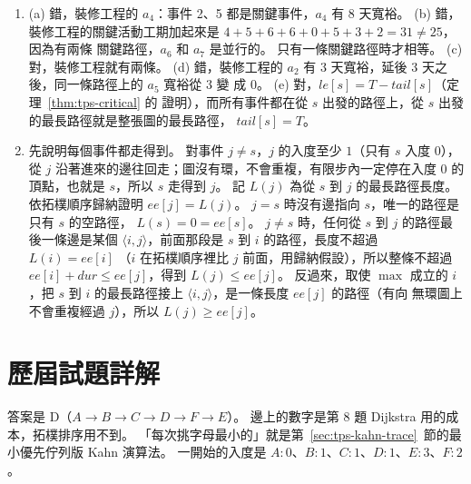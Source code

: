 \begin{enumerate}
\item (a) 錯，裝修工程的 $a_4$：事件 2、5 都是關鍵事件，$a_4$ 有 $8$ 天寬裕。 (b) 錯，
裝修工程的關鍵活動工期加起來是 $4 + 5 + 6 + 6 + 0 + 5 + 3 + 2 = 31 \ne 25$，因為有兩條
關鍵路徑，$a_6$ 和 $a_7$ 是並行的。 只有一條關鍵路徑時才相等。 (c) 對，裝修工程就有兩條。
(d) 錯，裝修工程的 $a_2$ 有 $3$ 天寬裕，延後 $3$ 天之後，同一條路徑上的 $a_5$ 寬裕從 $3$ 變
成 $0$。 (e) 對，$\mathit{le}[s] = T - \mathit{tail}[s]$（定理~\ref{thm:tps-critical} 的
證明），而所有事件都在從 $s$ 出發的路徑上，從 $s$ 出發的最長路徑就是整張圖的最長路徑，
$\mathit{tail}[s] = T$。

\item 先說明每個事件都走得到。 對事件 $j \ne s$，$j$ 的入度至少 $1$（只有 $s$ 入度 $0$），
從 $j$ 沿著進來的邊往回走；圖沒有環，不會重複，有限步內一定停在入度 $0$ 的頂點，也就是
$s$，所以 $s$ 走得到 $j$。 記 $L(j)$ 為從 $s$ 到 $j$ 的最長路徑長度。 依拓樸順序歸納證明
$\mathit{ee}[j] = L(j)$。 $j = s$ 時沒有邊指向 $s$，唯一的路徑是只有 $s$ 的空路徑，
$L(s) = 0 = \mathit{ee}[s]$。 $j \ne s$ 時，任何從 $s$ 到 $j$ 的路徑最後一條邊是某個
$\langle i, j \rangle$，前面那段是 $s$ 到 $i$ 的路徑，長度不超過 $L(i) = \mathit{ee}[i]$
（$i$ 在拓樸順序裡比 $j$ 前面，用歸納假設），所以整條不超過 $\mathit{ee}[i] + \mathit{dur}
\le \mathit{ee}[j]$，得到 $L(j) \le \mathit{ee}[j]$。 反過來，取使 $\max$ 成立的 $i$，把
$s$ 到 $i$ 的最長路徑接上 $\langle i, j \rangle$，是一條長度 $\mathit{ee}[j]$ 的路徑（有向
無環圖上不會重複經過 $j$），所以 $L(j) \ge \mathit{ee}[j]$。
\end{enumerate}

\section*{歷屆試題詳解}

答案是 D（$A \to B \to C \to D \to F \to E$）。 邊上的數字是第 8 題 Dijkstra 用的成本，拓樸排序用不到。
「每次挑字母最小的」就是第~\ref{sec:tps-kahn-trace}~節的最小優先佇列版 Kahn 演算法。 一開始的入度是
$A\colon 0$、$B\colon 1$、$C\colon 1$、$D\colon 1$、$E\colon 3$、$F\colon 2$。

